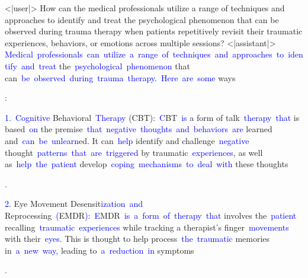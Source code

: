 \documentclass{article}
\begin{document}
\begin{tcolorbox}[colframe=black,colback=white]
<|user|>
How can the medical professionals utilize a range of techniques and approaches to identify and treat the psychological phenomenon that can be observed during trauma therapy when patients repetitively revisit their traumatic experiences, behaviors, or emotions across multiple sessions?
<|assistant|>
\textcolor{blue}{Medical}\textcolor{blue}{~professionals}\textcolor{blue}{~can}\textcolor{blue}{~utilize}\textcolor{blue}{~a}\textcolor{blue}{~range}\textcolor{blue}{~of}\textcolor{blue}{~techniques}\textcolor{blue}{~and}\textcolor{blue}{~approaches}\textcolor{blue}{~to}\textcolor{blue}{~identify}\textcolor{blue}{~and}\textcolor{blue}{~treat} the\textcolor{blue}{~psychological}\textcolor{blue}{~phenomenon} that can\textcolor{blue}{~be}\textcolor{blue}{~observed}\textcolor{blue}{~during}\textcolor{blue}{~trauma}\textcolor{blue}{~therapy}\textcolor{blue}{.}\textcolor{blue}{~Here}\textcolor{blue}{~are}\textcolor{blue}{~some} ways\textcolor{blue}{:

}\textcolor{blue}{1}\textcolor{blue}{.}\textcolor{blue}{~Cognitive} Behavioral\textcolor{blue}{~Therapy} (CBT):\textcolor{blue}{~C}BT\textcolor{blue}{~is} a form of talk\textcolor{blue}{~therapy}\textcolor{blue}{~that} is based\textcolor{blue}{~on} the premise\textcolor{blue}{~that}\textcolor{blue}{~negative}\textcolor{blue}{~thoughts}\textcolor{blue}{~and}\textcolor{blue}{~behaviors}\textcolor{blue}{~are} learned and\textcolor{blue}{~can}\textcolor{blue}{~be}\textcolor{blue}{~un}\textcolor{blue}{learn}ed\textcolor{blue}{.} It can\textcolor{blue}{~help} identify and challenge\textcolor{blue}{~negative} thought\textcolor{blue}{~patterns}\textcolor{blue}{~that}\textcolor{blue}{~are}\textcolor{blue}{~triggered} by traumatic\textcolor{blue}{~experiences}, as well as\textcolor{blue}{~help}\textcolor{blue}{~the}\textcolor{blue}{~patient} develop\textcolor{blue}{~coping}\textcolor{blue}{~mechanisms}\textcolor{blue}{~to}\textcolor{blue}{~deal}\textcolor{blue}{~with} these thoughts\textcolor{blue}{.

}\textcolor{blue}{2}\textcolor{blue}{.} Eye Movement Desensit\textcolor{blue}{ization}\textcolor{blue}{~and} Reprocessing\textcolor{blue}{~(}EMDR\textcolor{blue}{):}\textcolor{blue}{~E}MDR\textcolor{blue}{~is}\textcolor{blue}{~a}\textcolor{blue}{~form}\textcolor{blue}{~of}\textcolor{blue}{~therapy}\textcolor{blue}{~that} involves the\textcolor{blue}{~patient} recalling\textcolor{blue}{~traumatic}\textcolor{blue}{~experiences} while tracking a therapist's finger\textcolor{blue}{~movements} with their\textcolor{blue}{~eyes}\textcolor{blue}{.} This is thought to help process\textcolor{blue}{~the}\textcolor{blue}{~traumatic} memories in\textcolor{blue}{~a}\textcolor{blue}{~new}\textcolor{blue}{~way}\textcolor{blue}{,} leading to\textcolor{blue}{~a}\textcolor{blue}{~reduction}\textcolor{blue}{~in} symptoms\textcolor{blue}{.

}
\end{tcolorbox}
\end{document}
